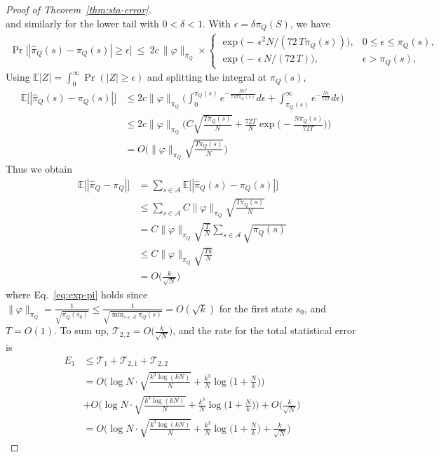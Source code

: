 \documentclass{article}
\theoremstyle{plain}
\theoremstyle{definition}
\theoremstyle{remark}
\begin{document}
\begin{proof}[Proof of Theorem~\ref{thm:sta-error}]
\[\]
and similarly for the lower tail with $0<\delta<1$. With $\epsilon=\delta \pi_Q(S)$, we have
\begin{align}
    \Pr\!\big[|\hat \pi_Q(s)-\pi_Q(s)| \ge \epsilon\big]
\ \le\
2c\,\|\varphi\|_{\pi_Q}\times
\begin{cases}
\exp\!\big(-\,\epsilon^{2} N/(72\,T\pi_Q(s))\big), & 0\le \epsilon \le \pi_Q(s),\\[4pt]
\exp\!\big(-\,\epsilon\,N/(72\,T)\big), & \epsilon>\pi_Q(s),
\end{cases}
\end{align}
Using $\mathbb E|Z|=\int_{0}^{\infty}\Pr (|Z|\ge\epsilon)$ and splitting the integral at $\pi_Q(s)$,
\begin{align}
    \mathbb E\big[|\hat \pi_Q(s)-\pi_Q(s)| \big]&\le 2c\|\varphi\|_{\pi_Q}\Big( \int_{0}^{\pi_Q(s)}e^{-\frac{N\epsilon^2}{72T\pi_Q(s)}}d\epsilon+\int_{\pi_Q(s)}^{\infty}e^{-\frac{N\epsilon}{72T}}d\epsilon\Big) \\
    &\leq 2c\|\varphi\|_{\pi_Q}\bigg(C\sqrt{\frac{T\pi_Q(s)}{N}} +\frac{72T}{N}\exp\big(-\frac{N\pi_Q(s)}{72T}\big)\bigg)\\
    & = O\bigg(\|\varphi\|_{\pi_Q}\sqrt{\frac{T\pi_Q(s)}{N}}\bigg)
\end{align}
Thus we obtain
\begin{align}
     \mathbb E\big[|\hat \pi_Q-\pi_Q| \big]&=\sum_{s\in \mathcal{A}} \mathbb E\big[|\hat \pi_Q(s)-\pi_Q(s)| \big] \\
     & \le \sum_{s\in \mathcal{A}}  C \|\varphi\|_{\pi_Q}\sqrt{\frac{T\pi_Q(s)}{N}} \\
     & = C \|\varphi\|_{\pi_Q}\sqrt{\frac{T}{N}}   \sum_{s\in \mathcal{A}} \sqrt{\pi_Q(s)}\\
     &
     \le   C \|\varphi\|_{\pi_Q}\sqrt{\frac{Tk}{N}} \\
     &= O\Big(\frac{k}{\sqrt{N}}\Big) \label{eq:exp-pi}
\end{align}
where Eq.~\ref{eq:exp-pi} holds since $\|\varphi\|_{\pi_Q}=\frac{1}{\sqrt{\pi_Q(s_0)}}\le \frac{1}{\sqrt{\min_{s\in\mathcal{A}}\pi_Q(s)}}=O(\sqrt{k})$ for the first state $s_0$, and $T=O(1)$. To sum up, $\mathcal{T}_{2,2}=O\Big(\frac{k}{\sqrt{N}}\Big)$, and the rate for the total statistical error is
\begin{align}
    E_1 &\le \mathcal{T}_{1}+\mathcal{T}_{2,1}+\mathcal{T}_{2,2}\\
    &= O\Big(\log N\cdot \sqrt{\frac{k^3\log(kN)}{N}}+\frac{k^3}{N}\log\big(1+\frac{N}{k}\big)\Big)\nonumber \\&+O\Big(\log N\cdot \sqrt{\frac{k^3\log(kN)}{N}}+\frac{k^3}{N}\log\big(1+\frac{N}{k}\big)\Big)+O\Big(\frac{k}{\sqrt{N}}\Big) \\
    & = O\Big(\log N\cdot \sqrt{\frac{k^3\log(kN)}{N}}+\frac{k^3}{N}\log\big(1+\frac{N}{k}\big)+\frac{k}{\sqrt{N}} \Big) \label{eq:final-sta-error}
\end{align}



 \end{proof}
\end{document}
